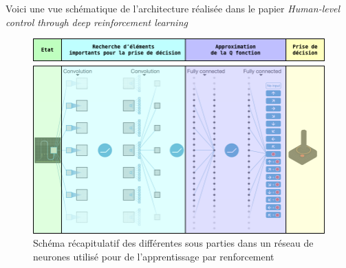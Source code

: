 Voici une vue schématique de l'architecture réalisée dans le papier \emph{Human-level control through deep reinforcement learning}\cite{mnih-dqn-2015}
\begin{figure}
\begin{center}
    \includegraphics[scale=.5]{./assets/DeepLearning/DP_EX.png}
    \caption{Schéma récapitulatif des différentes sous parties dans un réseau de neurones utilisé pour de l'apprentissage par renforcement}
\end{center}
\end{figure}
